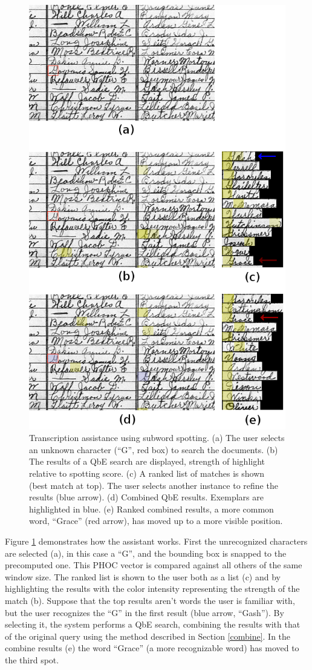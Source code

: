 \documentclass[ms,electronic,twosidetoc,letterpaper,chaptercenter,parttop,lof,lot]{byumsphd}
\begin{document}
\begin{figure}
    \centering
    \includegraphics[width=.65\textwidth]{assist_demo}
    \caption{Transcription assistance using subword spotting. (a) The user selects an unknown character (``G'', red box) to search the documents. (b) The results of a QbE search are displayed, strength of highlight relative to spotting score. (c) A ranked list of matches is shown (best match at top). The user selects another instance to refine the results (blue arrow). (d) Combined QbE results. Exemplars are highlighted in blue. (e) Ranked combined results, a more common word, ``Grace'' (red arrow), has moved up to a more visible position.}
    \label{fig:assist_demo}
\end{figure}

Figure \ref{fig:assist_demo} demonstrates how the assistant works. First the unrecognized characters are selected (a), in this case a  ``G'', and the bounding box is snapped to the precomputed one. This PHOC vector is compared against all others of the same window size. The ranked list is shown to the user both as a list (c) and by highlighting the results with the color intensity representing the strength of the match (b). Suppose that the top results aren't words the user is familiar with, but the user recognizes the ``G'' in the first result (blue arrow, ``Gash''). By selecting it, the system performs a QbE search, combining the results with that of the original query using the method described in Section \ref{combine}. In the combine results (e) the word ``Grace'' (a more recognizable word) has moved to the third spot.
\end{document}
